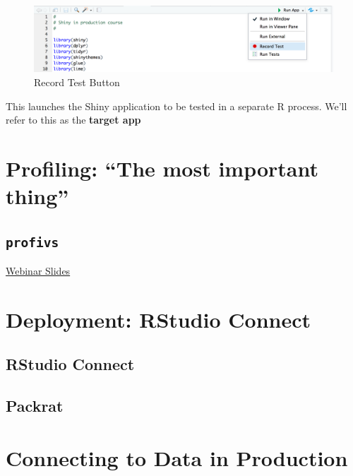 \documentclass[]{book}
\begin{document}
\begin{figure}
\centering
\includegraphics{imgs/testing/record_test_button.png}
\caption{Record Test Button}
\end{figure}

This launches the Shiny application to be tested in a separate R
process. We'll refer to this as the \textbf{target app}

\hypertarget{profiling-the-most-important-thing}{%
\chapter{Profiling: ``The most important
thing''}\label{profiling-the-most-important-thing}}

\hypertarget{profivs}{%
\section{\texorpdfstring{\texttt{profivs}}{profivs}}\label{profivs}}

\href{https://github.com/rstudio/webinars/blob/master/26-Profiling/Profiling.pdf}{Webinar
Slides}

\hypertarget{deployment-rstudio-connect}{%
\chapter{Deployment: RStudio Connect}\label{deployment-rstudio-connect}}

\hypertarget{rstudio-connect}{%
\section{RStudio Connect}\label{rstudio-connect}}

\hypertarget{packrat}{%
\section{Packrat}\label{packrat}}

\hypertarget{connecting-to-data-in-production}{%
\chapter{Connecting to Data in
Production}\label{connecting-to-data-in-production}}
\end{document}

